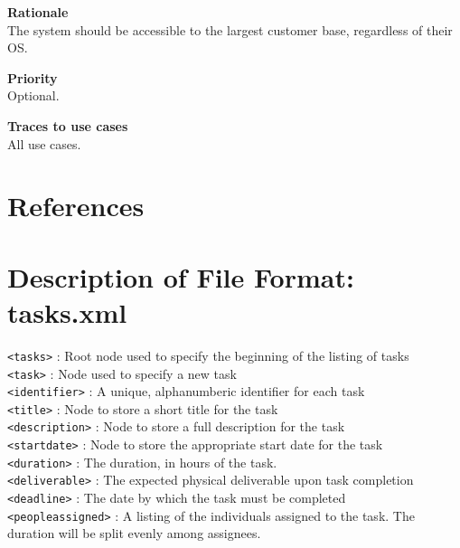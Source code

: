 \documentclass[12pt]{article}
\begin{document}
\noindent
{\bf Rationale}\\
The system should be accessible to the largest customer base, regardless of their OS.

\noindent
{\bf Priority}\\
Optional.

\noindent
{\bf Traces to use cases}\\
All use cases.

\section{References}

\pagebreak

\appendix

\section{Description of File Format: tasks.xml}

\texttt{<tasks>} : Root node used to specify the beginning of the listing of tasks \\

\texttt{<task>} : Node used to specify a new task \\

\texttt{<identifier>} : A unique, alphanumberic identifier for each task \\

\texttt{<title>} : Node to store a short title for the task \\

\texttt{<description>} : Node to store a full description for the task \\

\texttt{<startdate>} : Node to store the appropriate start date for the task \\

\texttt{<duration>} : The duration, in hours of the task. \\

\texttt{<deliverable>} : The expected physical deliverable upon task completion \\

\texttt{<deadline>} : The date by which the task must be completed \\

\texttt{<peopleassigned>} : A listing of the individuals assigned to the task.
The duration will be split evenly among assignees. \\
\end{document}
